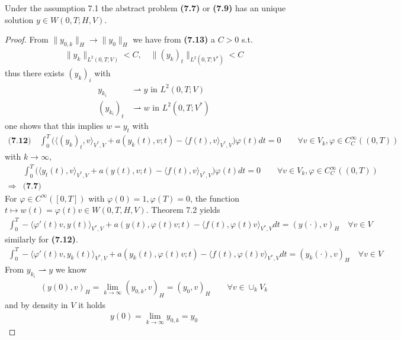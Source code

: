 \begin{theorem}
	Under the assumption 7.1 the abstract problem \textbf{(7.7)} or \textbf{(7.9)} has an unique solution $y \in W(0, T; H, V)$. 
\end{theorem}
\begin{proof}
	From $\|y_{0, k}\|_H \rightarrow \|y_0\|_H$ we have from \textbf{(7.13)} a $C > 0$ s.t.
	\begin{align*}
		\|y_k\|_{L^2(0, T;V)} < C, \quad \|(y_k)_t\|_{L^2(0, T; V^*)} < C
	\end{align*}
	thus there exists $(y_k)_i$ with 
	\begin{align*}
		y_{k_i} &\rightharpoonup y \text{ in } L^2(0, T; V)\\
		(y_{k_i})_t &\rightharpoonup w \text{ in } L^2(0, T; V^*)
	\end{align*}
	one shows that this implies $w = y_t$ with 
	\begin{align*}
	\textbf{(7.12)} \quad
		\int_0^T \bigg( \langle (y_k)_t, v \rangle_{V^*, V} + a(y_k(t), v ; t) - \langle f(t), v \rangle_{V^*, V}\bigg) \varphi(t) dt  = 0 \qquad \forall v \in V_k, \varphi \in C_C^\infty((0, T))
	\end{align*}
	with $k \rightarrow \infty$, 
	\begin{align*}
		&\int_0^T \bigg(\langle y_t(t), v\rangle_{V^*,V} + a(y(t), v; t) - \langle f(t), v \rangle_{V^*, V}\bigg) \varphi(t) dt = 0 
		\qquad \forall v \in V_k, \varphi \in C_C^\infty((0, T))\\
		\Rightarrow &\textbf{(7.7)}
	\end{align*}
	For $\varphi \in C^\infty([0, T])$ with $\varphi(0) = 1, \varphi(T) = 0$, the function $t \mapsto w(t) = \varphi(t) v \in W(0, T, H, V)$. Theorem 7.2 yields 
	\begin{align*}
		\int_0^T - \langle \varphi'(t)v, y(t)\rangle_{V^*, V} + a(y(t), \varphi(t) v ; t) - \langle f(t), \varphi(t)v \rangle_{V^*, V} dt = (y(\cdot), v)_H \quad \forall v \in V 
	\end{align*}
	similarly for \textbf{(7.12)}.
	\begin{align*}
		\int_0^T - \langle \varphi'(t)v, y_k(t)\rangle_{V^*, V} + a(y_k(t), \varphi(t) v ; t) - \langle f(t), \varphi(t)v \rangle_{V^*, V} dt = (y_k(\cdot), v)_H \quad \forall v \in V 	
	\end{align*}
	From $y_{k_i} \rightharpoonup y$ we know 
	\begin{align*}
		(y(0), v)_H = \lim_{k \rightarrow \infty} (y_{0, k}, v )_H = (y_0, v)_H \qquad \forall v \in \cup_k V_k
	\end{align*}
	and by density in $V$ it holds
	\begin{align*}
		y(0) = \lim_{k \rightarrow \infty} y_{0, k} = y_0
	\end{align*}
\end{proof}

